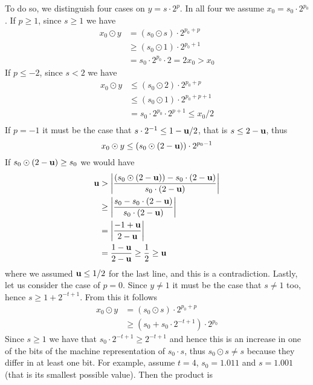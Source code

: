 \begin{example}
	To do so, we distinguish four cases on $y = s \cdot 2^p$. In all four we assume $x_0 = s_0 \cdot 2^{p_0}$.
	If $p \ge 1$, since $s \ge 1$ we have
	\begin{align*}
		x_0 \odot y &= (s_0 \odot s) \cdot 2^{p_0 + p} \\
		&\ge (s_0 \odot 1) \cdot 2^{p_0 + 1} \\
		&= s_0 \cdot 2^{p_0} \cdot 2 = 2 x_0 > x_0
	\end{align*}
	If $p \le -2$, since $s < 2$ we have
	\begin{align*}
		x_0 \odot y &\le (s_0 \odot 2) \cdot 2^{p_0 + p} \\
		&\le (s_0 \odot 1) \cdot 2^{p_0 + p + 1} \\
		&= s_0 \cdot 2^{p_0} \cdot 2^{p + 1} \le x_0 / 2\\
	\end{align*}
	If $p = -1$ it must be the case that $s \cdot 2^{-1} \le 1 - \textbf{u} / 2$, that is $s \le 2 - \textbf{u}$, thus
	\[
	x_0 \odot y \le (s_0 \odot (2 - \textbf{u})) \cdot 2^{p_0 - 1}
	\]
	If $s_0 \odot (2 - \textbf{u}) \ge s_0$ we would have
	\begin{align*}
		\textbf{u} &> \left\lvert \frac{(s_0 \odot (2 - \textbf{u})) - s_0 \cdot (2 - \textbf{u})}{s_0 \cdot (2 - \textbf{u})} \right\rvert \\
		&\ge \left\lvert \frac{s_0 - s_0 \cdot (2 - \textbf{u})}{s_0 \cdot (2 - \textbf{u})} \right\rvert \\
		&= \left\lvert \frac{- 1 + \textbf{u}}{2 - \textbf{u}} \right\rvert \\
		&= \frac{1 - \textbf{u}}{2 - \textbf{u}} \ge \frac{1}{2} \ge \textbf{u}\\
	\end{align*}
	where we assumed $\textbf{u} \le 1/2$ for the last line, and this is a contradiction.
	Lastly, let us consider the case of $p = 0$. Since $y \neq 1$ it must be the case that $s \neq 1$ too, hence $s \ge 1 + 2^{-t+1}$. From this it follows
	\begin{align*}
		x_0 \odot y &= (s_0 \odot s) \cdot 2^{p_0 + p} \\
		&\ge (s_0 + s_0 \cdot 2^{-t+1}) \cdot 2^{p_0}
	\end{align*}
	Since $s \ge 1$ we have that $s_0 \cdot 2^{-t+1} \ge 2^{-t+1}$ and hence this is an increase in one of the bits of the machine representation of $s_0 \cdot s$, thus $s_0 \odot s \neq s$ because they differ in at least one bit.
	For example, assume $t = 4$, $s_0 = 1.011$ and $s = 1.001$ (that is its smallest possible value). Then the product is

\end{example}
